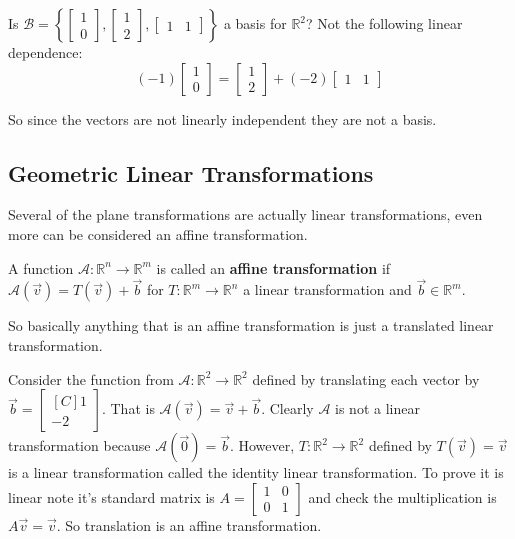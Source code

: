 \begin{example}
Is $\mathcal{B}=\left\{\begin{bmatrix}1 \\ 0 \end{bmatrix}, \begin{bmatrix}1 \\ 2  \end{bmatrix}, \begin{bmatrix}1 & 1 \end{bmatrix}\right\}$ a basis for $\mathbb{R}^2$?
Not the following linear dependence:
\[
(-1)\begin{bmatrix}1 \\ 0 \end{bmatrix}= \begin{bmatrix}1 \\ 2  \end{bmatrix}+(-2)\begin{bmatrix}1 & 1 \end{bmatrix}
\]

So since the vectors are not linearly independent they are not a basis.
\end{example}



\subsection{Geometric Linear Transformations}
Several of the plane transformations are actually linear transformations, even more can be considered an affine transformation.

\begin{definition}
A function $\mathcal{A}:\mathbb{R}^n \to \mathbb{R}^m$ is called an \textbf{affine transformation} if 
$\mathcal{A}(\vec{v})=T(\vec{v})+\vec{b}$ for $T:\mathbb{R}^m \to \mathbb{R}^n$ a linear transformation and $\vec{b} \in \mathbb{R}^m$. 
\end{definition}

\begin{remark}
So basically anything that is an affine transformation is just a translated linear transformation.
\end{remark}

\begin{example} Consider the function from $\mathcal{A}:\mathbb{R}^2 \to \mathbb{R}^2$ defined by translating each vector by 
$\vec{b}=\begin{bmatrix*}[C] 1 \\ -2 \end{bmatrix*}$. That is $\mathcal{A}(\vec{v})=\vec{v}+\vec{b}$. Clearly $\mathcal{A}$ is not a linear transformation
because $\mathcal{A}(\vec{0})=\vec{b}$. However, $T:\mathbb{R}^2 \to \mathbb{R}^2$ defined by $T(\vec{v})=\vec{v}$ is a linear transformation 
called the identity linear transformation. To prove it is linear note it's standard matrix is $A=\begin{bmatrix} 1 & 0 \\ 0 & 1 \end{bmatrix}$ and check the multiplication is $A\vec{v}=\vec{v}$. So translation is an affine transformation.
\end{example}


